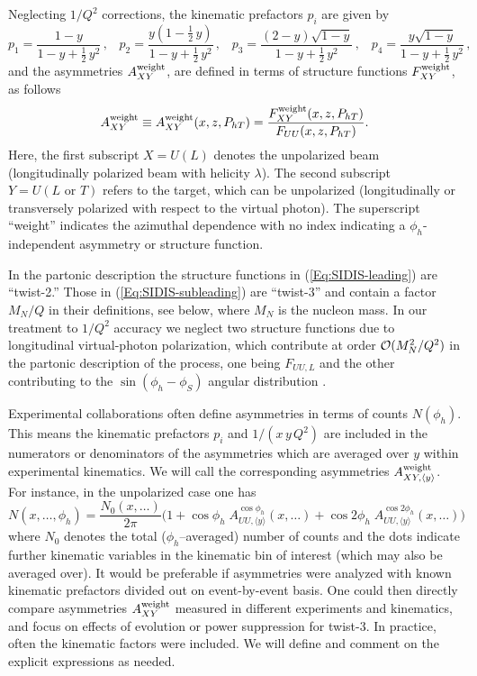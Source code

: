 \documentclass[a4paper,11pt]{article}
\newcommand{\be}{\begin{equation}}
\newcommand{\ee}{\end{equation}}
\newcommand{\asym}[2]{{A_{#1}^{#2}}}
\newcommand{\asympre}[2]{{A_{#1,\langle y\rangle}^{#2}}}
\def\Phperp{P_{hT}}
\begin{document}
Neglecting $1/Q^2$ corrections, the kinematic prefactors $p_i$ are given by
\be\label{Eq:y-prefactors}
	p_1 = \frac{1-y}{1-y+\frac12\,y^2} 		\, , \;\;\;
	p_2 = \frac{y(1-\frac12\,y)}{1-y+\frac12\,y^2}	\, , \;\;\;
	p_3 = \frac{(2-y)\sqrt{1-y}}{1-y+\frac12\,y^2} 	\, , \;\;\;
	p_4 = \frac{y\sqrt{1-y}}{1-y+\frac12\,y^2}     	\, ,
\ee
and the asymmetries {$A_{XY}^{\rm weight}$,  are defined in terms of
structure functions $F_{XY}^{\rm weight}$, as follows}
\be
	A_{XY}^{\rm weight}\equiv A_{XY}^{\rm weight}(x,z,\Phperp)=
	\frac{F_{XY}^{\rm weight}(x,z,\Phperp)}{F_{UU}(x,z,\Phperp)}.
\ee
Here, the first subscript $X=U(L)$ denotes the unpolarized beam
(longitudinally polarized beam with helicity $\lambda$). The second
subscript $Y=U(L\text{ or }T)$ refers to the target, which can be unpolarized
(longitudinally or transversely polarized with respect to the virtual photon).
The superscript ``weight'' indicates the azimuthal dependence with no index
indicating a $\phi_h$-independent asymmetry or structure function. 

In the partonic description the structure functions in
(\ref{Eq:SIDIS-leading})    are ``twist-2.'' Those in
(\ref{Eq:SIDIS-subleading}) are ``twist-3'' and contain a
factor $M_N/Q$ in their definitions, see below,
where $M_N$ is the nucleon mass. In our treatment to $1/Q^2$
accuracy we neglect two structure functions due to longitudinal virtual-photon
polarization, which contribute at order ${\cal O}(M_N^2/Q^2)$ in the
partonic description of the process, one being $F_{UU,L}$ and the other
contributing to the $\sin(\phi_h-\phi_S)$ angular distribution
\cite{Bacchetta:2006tn}.

Experimental collaborations often define asymmetries in terms of counts
$N(\phi_h)$. This means the kinematic prefactors $p_i$ and $1/(x\,y\,Q^2)$
are included in the numerators or denominators of the asymmetries which
are averaged over $y$ within experimental kinematics. We will call the
corresponding asymmetries $\asympre{XY}{\rm weight}$.
For instance, in the unpolarized case one has
\be
	N(x,\dots,\phi_h) = \frac{N_0(x,\dots)}{2\pi} \biggl(1
		+ \cos\phi_h\;\asympre{UU}{\cos\phi_h}(x,\dots)
		+ \cos2\phi_h\;\asympre{UU}{\cos2\phi_h}(x,\dots)\Biggr)
\ee
where $N_0$ denotes the total ($\phi_h$--averaged) number of counts
and the dots indicate further kinematic variables in the kinematic
bin of interest (which may also be averaged over).
It would be preferable if asymmetries were analyzed with known kinematic
prefactors divided out on event-by-event basis. One could then directly
compare asymmetries $\asym{XY}{\rm weight}$ measured in different
experiments and kinematics, and focus on effects of evolution
or power suppression for twist-3. In practice, often the kinematic
factors were included. We will define and comment on the explicit
expressions as needed.
\end{document}
